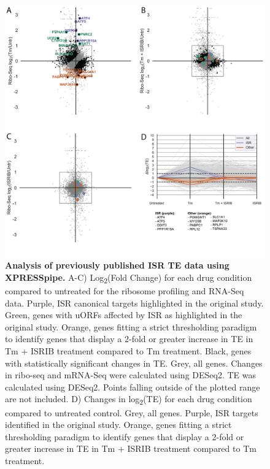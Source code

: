 \documentclass[10pt, oneside]{article}
\begin{document}
\begin{figure}
\centering
  \includegraphics[width=180mm]{figures/xpresspipe_figure3.png}
  \caption{\textbf{Analysis of previously published ISR TE data using XPRESSpipe.} A-C) Log\textsubscript{2}(Fold Change) for each drug condition compared to untreated for the ribosome profiling and RNA-Seq data. Purple, ISR canonical targets highlighted in the original study. Green, genes with uORFs affected by ISR as highlighted in the original study. Orange, genes fitting a strict thresholding paradigm to identify genes that display a 2-fold or greater increase in TE in Tm + ISRIB treatment compared to Tm treatment. Black, genes with statistically significant changes in TE. Grey, all genes. Changes in ribo-seq and mRNA-Seq were calculated using DESeq2. TE was calculated using DESeq2. Points falling outside of the plotted range are not included. D) Changes in log\textsubscript{2}(TE) for each drug condition compared to untreated control. Grey, all genes. Purple, ISR targets identified in the original study. Orange, genes fitting a strict thresholding paradigm to identify genes that display a 2-fold or greater increase in TE in Tm + ISRIB treatment compared to Tm treatment.}
  \label{fig:figure3}
\end{figure}
\end{document}
